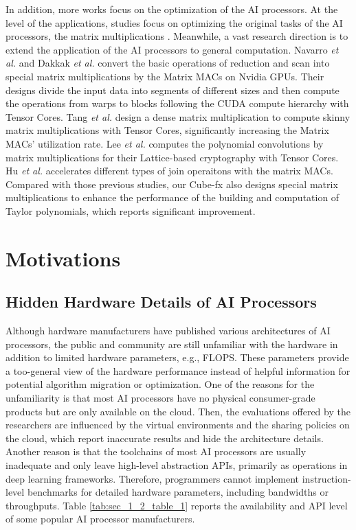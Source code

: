 In addition, more works focus on the optimization of the AI processors. At the level of the applications, studies focus on optimizing the original tasks of the AI processors, the matrix multiplications \cite{gccblas, oneapi, 9820727, 9139835}. Meanwhile, a vast research direction is to extend the application of the AI processors to general computation. Navarro \textit{et al.} \cite{DBLP:conf/sccc/CarrascoVN18} and Dakkak \textit{et al.} \cite{DBLP:conf/ics/DakkakLXGH19} convert the basic operations of reduction and scan into special matrix multiplications by the Matrix MACs on Nvidia GPUs. Their designs divide the input data into segments of different sizes and then compute the operations from warps to blocks following the CUDA compute hierarchy with Tensor Cores. Tang \textit{et al.} \cite{DBLP:conf/ic-nc/TangK0K20} design a dense matrix multiplication to compute skinny matrix multiplications with Tensor Cores, significantly increasing the Matrix MACs' utilization rate. Lee \textit{et al.} \cite{DBLP:journals/access/LeeSZH22} computes the polynomial convolutions by matrix multiplications for their Lattice-based cryptography with Tensor Cores. Hu \textit{et al.} \cite{10.1145/3514221.3517869} accelerates different types of join operaitons with the matrix MACs. Compared with those previous studies, our Cube-fx also designs special matrix multiplications to enhance the performance of the building and computation of Taylor polynomials, which reports significant improvement.

\section{Motivations}
\label{sec_1_2_motivations}

\subsection{Hidden Hardware Details of AI Processors}

Although hardware manufacturers have published various architectures of AI processors, the public and community are still unfamiliar with the hardware in addition to limited hardware parameters, e.g., FLOPS. These parameters provide a too-general view of the hardware performance instead of helpful information for potential algorithm migration or optimization. One of the reasons for the unfamiliarity is that most AI processors have no physical consumer-grade products but are only available on the cloud. Then, the evaluations offered by the researchers are influenced by the virtual environments and the sharing policies on the cloud, which report inaccurate results and hide the architecture details. Another reason is that the toolchains of most AI processors are usually inadequate and only leave high-level abstraction APIs, primarily as operations in deep learning frameworks. Therefore, programmers cannot implement instruction-level benchmarks for detailed hardware parameters, including bandwidths or throughputs. Table \ref{tab:sec_1_2_table_1} reports the availability and API level of some popular AI processor manufacturers.

